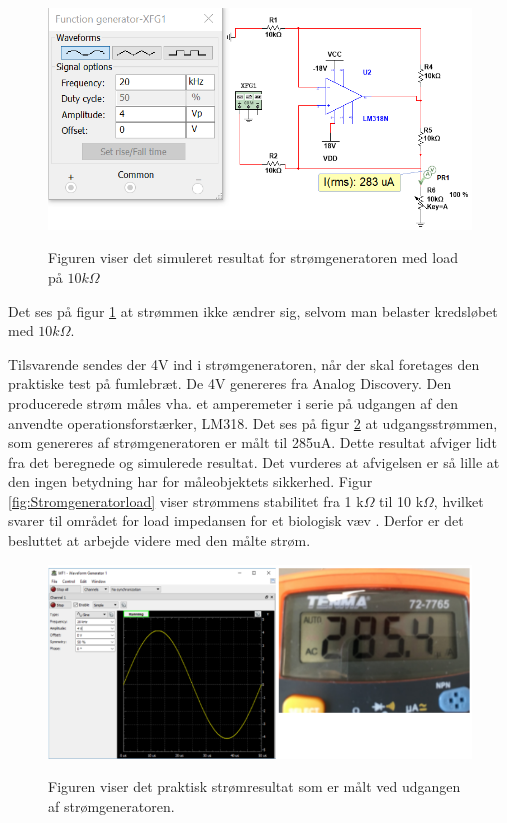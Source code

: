 \begin{figure}[H] 
\centering
{\includegraphics[width=\linewidth]
{Figure/SimuleretStromMedLoad}}
\caption{Figuren viser det simuleret resultat for  strømgeneratoren med load på $10k\Omega$}
\label{SimTestStromNoLoad}
\end{figure}

Det ses på figur \ref{SimTestStromNoLoad} at strømmen ikke ændrer sig, selvom man belaster kredsløbet med $ 10k\Omega	$.   



\pagebreak
Tilsvarende sendes der 4V ind i strømgeneratoren, når der skal foretages den praktiske test på fumlebræt. De 4V genereres fra Analog Discovery. Den producerede strøm måles vha. 
et amperemeter i serie på udgangen af den anvendte operationsforstærker, LM318. Det ses på figur \ref{TestStrGen} at udgangsstrømmen, som genereres af strømgeneratoren er målt til 285uA. Dette resultat afviger lidt fra det beregnede og simulerede resultat. Det vurderes at afvigelsen er så lille at den ingen betydning har for måleobjektets sikkerhed. Figur \ref{fig:Stromgeneratorload} viser strømmens stabilitet fra 1 k$\Omega$ til 10 k$\Omega$, hvilket svarer til området for load impedansen for et biologisk væv \citep{Chester2014}. Derfor er det besluttet at arbejde videre med den målte strøm. 


\begin{figure}[H] 
\centering
{\includegraphics[width=\linewidth]
{Figure/VCCStestParktisk}}
\caption{Figuren viser det praktisk strømresultat som er målt ved udgangen af strømgeneratoren.}
\label{TestStrGen}
\end{figure}

